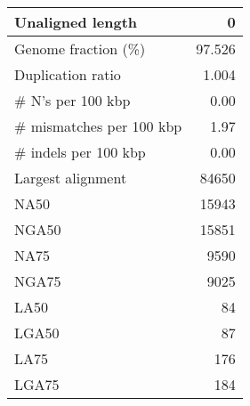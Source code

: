 \documentclass[12pt,a4paper]{article}
\begin{document}
\begin{table}[ht]
\begin{center}
\begin{tabular}{|l*{1}{|r}|}
Unaligned length & 0 \\ \hline
Genome fraction (\%) & 97.526 \\ \hline
Duplication ratio & 1.004 \\ \hline
\# N's per 100 kbp & 0.00 \\ \hline
\# mismatches per 100 kbp & 1.97 \\ \hline
\# indels per 100 kbp & 0.00 \\ \hline
Largest alignment & 84650 \\ \hline
NA50 & 15943 \\ \hline
NGA50 & 15851 \\ \hline
NA75 & 9590 \\ \hline
NGA75 & 9025 \\ \hline
LA50 & 84 \\ \hline
LGA50 & 87 \\ \hline
LA75 & 176 \\ \hline
LGA75 & 184 \\ \hline
\end{tabular}
\end{center}
\end{table}
\end{document}

